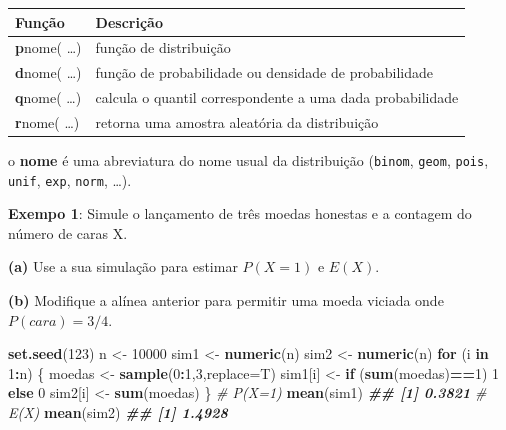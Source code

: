 \documentclass[
]{book}
\newenvironment{Shaded}{\begin{snugshade}}{\end{snugshade}}
\newcommand{\AttributeTok}[1]{\textcolor[rgb]{0.13,0.29,0.53}{#1}}
\newcommand{\CommentTok}[1]{\textcolor[rgb]{0.56,0.35,0.01}{\textit{#1}}}
\newcommand{\ControlFlowTok}[1]{\textcolor[rgb]{0.13,0.29,0.53}{\textbf{#1}}}
\newcommand{\DecValTok}[1]{\textcolor[rgb]{0.00,0.00,0.81}{#1}}
\newcommand{\DocumentationTok}[1]{\textcolor[rgb]{0.56,0.35,0.01}{\textbf{\textit{#1}}}}
\newcommand{\FunctionTok}[1]{\textcolor[rgb]{0.13,0.29,0.53}{\textbf{#1}}}
\newcommand{\NormalTok}[1]{#1}
\newcommand{\OtherTok}[1]{\textcolor[rgb]{0.56,0.35,0.01}{#1}}
\newcommand{\SpecialCharTok}[1]{\textcolor[rgb]{0.81,0.36,0.00}{\textbf{#1}}}
\begin{document}
\begin{longtable}[]{@{}
  >{\raggedright\arraybackslash}p{}
  >{\raggedright\arraybackslash}p{}@{}}
\toprule\noalign{}
\begin{minipage}[b]{\linewidth}\raggedright
\textbf{Função}
\end{minipage} & \begin{minipage}[b]{\linewidth}\raggedright
\textbf{Descrição}
\end{minipage} \\
\midrule\noalign{}
\endhead
\bottomrule\noalign{}
\endlastfoot
\textbf{p}nome( \ldots) & função de distribuição \\
\textbf{d}nome( \ldots) & função de probabilidade ou densidade de probabilidade \\
\textbf{q}nome( \ldots) & calcula o quantil correspondente a uma dada probabilidade \\
\textbf{r}nome( \ldots) & retorna uma amostra aleatória da distribuição \\
\end{longtable}

o \textbf{nome} é uma abreviatura do nome usual da distribuição (\texttt{binom},
\texttt{geom}, \texttt{pois}, \texttt{unif}, \texttt{exp}, \texttt{norm}, \ldots).

\textbf{Exempo 1}: Simule o lançamento de três moedas honestas e a contagem
do número de caras X.

\textbf{(a)} Use a sua simulação para estimar \(P(X=1)\) e \(E(X)\).

\textbf{(b)} Modifique a alínea anterior para permitir uma moeda viciada onde
\(P(cara)=3/4\).

\begin{Shaded}
\begin{Highlighting}[]
\FunctionTok{set.seed}\NormalTok{(}\DecValTok{123}\NormalTok{)}
\NormalTok{n }\OtherTok{\textless{}{-}} \DecValTok{10000}
\NormalTok{sim1 }\OtherTok{\textless{}{-}} \FunctionTok{numeric}\NormalTok{(n)}
\NormalTok{sim2 }\OtherTok{\textless{}{-}} \FunctionTok{numeric}\NormalTok{(n)}
\ControlFlowTok{for}\NormalTok{ (i }\ControlFlowTok{in} \DecValTok{1}\SpecialCharTok{:}\NormalTok{n) \{}
\NormalTok{  moedas }\OtherTok{\textless{}{-}} \FunctionTok{sample}\NormalTok{(}\DecValTok{0}\SpecialCharTok{:}\DecValTok{1}\NormalTok{,}\DecValTok{3}\NormalTok{,}\AttributeTok{replace=}\NormalTok{T)}
\NormalTok{  sim1[i] }\OtherTok{\textless{}{-}} \ControlFlowTok{if}\NormalTok{ (}\FunctionTok{sum}\NormalTok{(moedas)}\SpecialCharTok{==}\DecValTok{1}\NormalTok{) }\DecValTok{1} \ControlFlowTok{else} \DecValTok{0}
\NormalTok{  sim2[i] }\OtherTok{\textless{}{-}} \FunctionTok{sum}\NormalTok{(moedas)}
\NormalTok{\}}
\CommentTok{\# P(X=1)}
\FunctionTok{mean}\NormalTok{(sim1)}
\DocumentationTok{\#\# [1] 0.3821}
\CommentTok{\# E(X)}
\FunctionTok{mean}\NormalTok{(sim2)}
\DocumentationTok{\#\# [1] 1.4928}
\end{Highlighting}
\end{Shaded}
\end{document}
